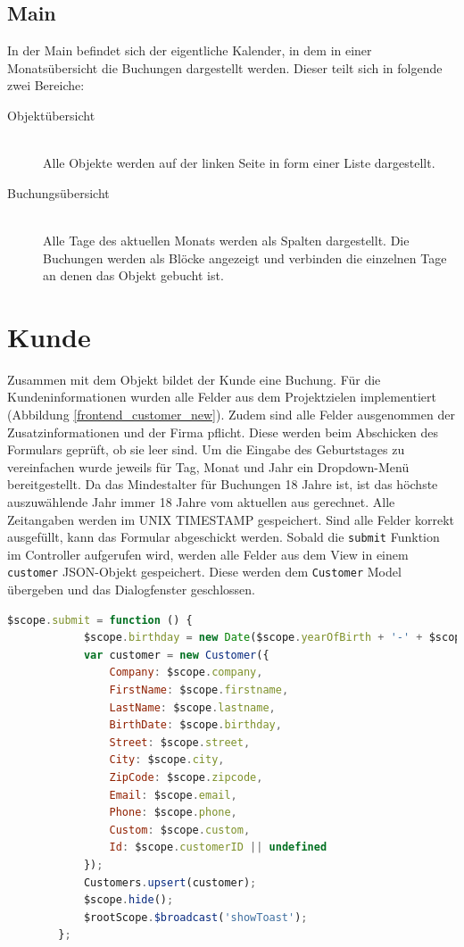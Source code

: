 \subsection{Main}
In der Main befindet sich der eigentliche Kalender, in dem in einer Monatsübersicht die Buchungen dargestellt werden. 
Dieser teilt sich in folgende zwei Bereiche:
\begin{description}
\item[Objektübersicht]\hfill \\
Alle Objekte werden auf der linken Seite in form einer Liste dargestellt.
\item[Buchungsübersicht]\hfill \\ 
Alle Tage des aktuellen Monats werden als Spalten dargestellt. Die Buchungen werden als Blöcke angezeigt und verbinden die einzelnen Tage an denen das Objekt gebucht ist.  
\end{description}

\section{Kunde}
Zusammen mit dem Objekt bildet der Kunde eine Buchung. Für die Kundeninformationen wurden alle Felder aus dem Projektzielen
implementiert (Abbildung \ref{frontend_customer_new}). Zudem sind alle Felder ausgenommen der Zusatzinformationen und der Firma pflicht.
Diese werden beim Abschicken des Formulars geprüft, ob sie leer sind. Um die Eingabe des Geburtstages zu vereinfachen wurde jeweils für Tag,
 Monat und Jahr ein Dropdown-Menü bereitgestellt. Da das Mindestalter für Buchungen 18 Jahre ist, ist das höchste auszuwählende Jahr immer 18
 Jahre vom aktuellen aus gerechnet. Alle Zeitangaben werden im UNIX TIMESTAMP gespeichert. Sind alle Felder korrekt ausgefüllt, kann das Formular
 abgeschickt werden. Sobald die \texttt{submit} Funktion im Controller aufgerufen wird, werden alle Felder aus dem View in einem \texttt{customer}
 JSON-Objekt gespeichert. Diese werden dem \texttt{Customer} Model übergeben und das Dialogfenster geschlossen.

\begin{lstlisting}[language=JavaScript, label=code_exampleRegistrationRequest, caption=submit Methode im customer Controller]
		$scope.submit = function () {
            $scope.birthday = new Date($scope.yearOfBirth + '-' + $scope.monthOfBirth + '-' + $scope.dayOfBirth).getTime();
            var customer = new Customer({
                Company: $scope.company,
                FirstName: $scope.firstname,
                LastName: $scope.lastname,
                BirthDate: $scope.birthday,
                Street: $scope.street,
                City: $scope.city,
                ZipCode: $scope.zipcode,
                Email: $scope.email,
                Phone: $scope.phone,
                Custom: $scope.custom,
                Id: $scope.customerID || undefined
            });
            Customers.upsert(customer);
            $scope.hide();
            $rootScope.$broadcast('showToast');
        };
\end{lstlisting}

